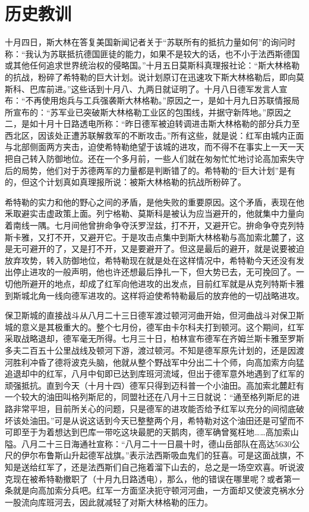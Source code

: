 \section[历史教训（一九四二年十月十四日）]{历史教训}


十月四日，斯大林在答复美国新闻记者关于“苏联所有的抵抗力量如何”的询问时称：“我认为苏联抵抗德国匪徒的能力，如果不是较大的话，也不小于法西斯德国或其他任何追求世界统治权的侵略国。”十月五日莫斯科真理报社论：“斯大林格勒的抗战，粉碎了希特勒的巨大计划。说计划原订在迅速攻下斯大林格勒后，即向莫斯科、巴库前进。”这些话到十月八、九两日就证明了。十月八日德军发言人宣布：“不再使用炮兵与工兵强袭斯大林格勒。”原因之一，是如十月九日苏联情报局所宣布的：“苏军业已突破斯大林格勒工业区的包围线，并据守新阵地。”原因之二，是如十月十日路透电所称：“昨日德军被迫转调进击斯大林格勒的部分兵力至西北区，因该处正遭苏联解救军的不断攻击。”所有这些，就是说：红军由城内正面与北部侧面两方夹击，迫使希特勒绝望于该城的进攻，而不得不在事实上一天一天把自己转入防御地位。还在一个多月前，一些人们就在匆匆忙忙地讨论高加索失守后的局势，他们对于苏德两军的力量都是判断错了的。希特勒的“巨大计划”是有的，但这个计划真如真理报所说：被斯大林格勒的抗战所粉碎了。

希特勒的实力和他的野心之间的矛盾，是他失败的重要原因。这个矛盾，表现在他釆取避实击虚政策上面。列宁格勒、莫斯科是被认为应当避开的，他就集中力量向着南线一隅。七月间他曾拚命争夺沃罗湼兹，打不开，又避开它。拚命争夺克列特斯卡雅，又打不开，又避开它。于是攻击点集中到斯大林格勒与高加索北麓了，这是无可避开的了，又是打不开，又是要避开了。但这是最后的避开，就是说要被迫放弃攻势，转入防御地位，希特勒现在就是处在这样情况中，希特勒今天还没有发出停止进攻的一般声明，他也许还想最后挣扎一下，但大势已去，无可挽回了。一切他所避开的地点，却成了红军向他进攻的出发点，目前红军就是从克列特斯卡雅到斯城北角一线向德军进攻的。这样将迫使希特勒最后的放弃他的一切战略进攻。

保卫斯城的直接战斗从八月二十三日德军渡过顿河河曲开始，但河曲战斗对保卫斯城的意义是其极重大的。整个七月份，德军由卡尔科夫打到顿河。这个期间，红军采取战略退却，德军毫无所得。七月三十日，柏林宣布德军在齐姆兰斯卡雅至罗斯多夫二百五十公里战线及顿河下游，渡过顿河。不知是德军原先计划的，还是因渡河胜利冲昏了德将波克头脑，他就从整个野战军中分出二十个师，向高加索方向猛追退却中的红军，八月中旬即已达到库班河流域，但出于德军意外地遇到了红军的顽强抵抗。直到今天（十月十四）德军只得到迈科普一个小油田。高加索北麓赶有一个较大的油田叫格列斯尼的，同盟社还在八月十三日就说：“通至格列斯尼的进路非常平坦，目前所关心的问题，只是德军的进攻能否给予红军以充分的间彻底破坏该处油田。”可是从说这话到今天已整整两个月，希特勒对这个油田还是可望而不可即至于为着想达到巴库一带吃这块最肥的天鹅肉，德军确曾冤枉地……高加索山隘。八月二十三日海通社宣称：“八月二十一日晨十时，德山岳部队在高达5630公尺的伊尔布鲁斯山升起德军战旗。”表示法西斯吸血鬼们的狂喜。可是这面战旗，不知是送给红军了，还是法西斯们自己拖着溜下山去的，总之是一场空欢喜。听说波克现在被希特勒撤职了（十月九日路透电），那么，他的错误在哪里呢？或者第一条就是向高加索分兵吧。红军一方面坚决扼守顿河河曲，一方面却又使波克祸水分一股流向库班河去，因此就减轻了对斯大林格勒的压力。

